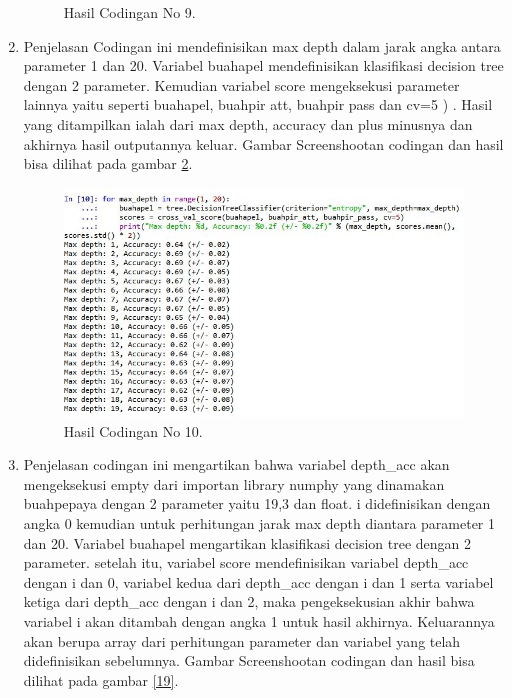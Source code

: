 \begin{enumerate}
\begin{figure}[!htbp]
		\caption{Hasil Codingan No 9.}
		\label{17}
\end{figure}
\item Penjelasan Codingan ini mendefinisikan max depth dalam jarak angka antara parameter 1 dan 20. Variabel buahapel mendefinisikan klasifikasi decision tree dengan 2 parameter. Kemudian variabel score mengeksekusi parameter lainnya yaitu seperti buahapel, buahpir att, buahpir pass dan cv=5 ) . Hasil yang ditampilkan ialah dari max depth, accuracy dan plus minusnya dan akhirnya hasil outputannya keluar.
\subitem Gambar Screenshootan codingan dan hasil bisa dilihat pada gambar \ref{18}.
\begin{figure}[!htbp]
		\centerline{\includegraphics[width=1\textwidth]{figures/huda/10_hari4.JPG}}
		\caption{Hasil Codingan No 10.}
		\label{18}
\end{figure}
\item Penjelasan codingan ini mengartikan bahwa variabel depth\_acc akan mengeksekusi empty dari importan library numphy yang dinamakan buahpepaya dengan 2 parameter yaitu 19,3 dan float. i didefinisikan dengan angka 0 kemudian untuk perhitungan jarak max depth diantara parameter 1 dan 20. Variabel buahapel mengartikan klasifikasi decision tree dengan 2 parameter. setelah itu, variabel score mendefinisikan variabel depth\_acc dengan i dan 0, variabel kedua dari depth\_acc dengan i dan 1 serta variabel ketiga dari depth\_acc dengan i dan 2, maka pengeksekusian akhir bahwa variabel i akan ditambah dengan angka 1 untuk hasil akhirnya. Keluarannya akan berupa array dari perhitungan parameter dan variabel yang telah didefinisikan sebelumnya.
\subitem Gambar Screenshootan codingan dan hasil bisa dilihat pada gambar \ref{19}.
\begin{figure}[!htbp]

\end{figure}
\end{enumerate}
